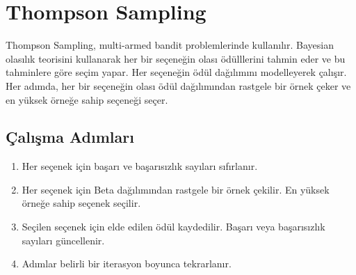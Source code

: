 \section{Thompson Sampling}

Thompson Sampling, multi-armed bandit problemlerinde kullanılır. Bayesian olasılık teorisini kullanarak her bir seçeneğin olası ödülllerini tahmin eder ve bu tahminlere göre seçim yapar. Her seçeneğin ödül dağılımını modelleyerek çalışır. Her adımda, her bir seçeneğin olası ödül dağılımından rastgele bir örnek çeker ve en yüksek örneğe sahip seçeneği seçer.

\subsection{Çalışma Adımları}

\begin{enumerate}
	\item Her seçenek için başarı ve başarısızlık sayıları sıfırlanır.
	\item Her seçenek için Beta dağılımından rastgele bir örnek çekilir. En yüksek örneğe sahip seçenek seçilir.
	\item Seçilen seçenek için elde edilen ödül kaydedilir. Başarı veya başarısızlık sayıları güncellenir.
	\item Adımlar belirli bir iterasyon boyunca tekrarlanır.
\end{enumerate}

\newpage